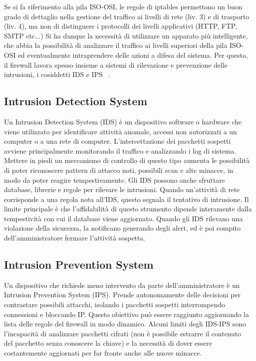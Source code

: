 Se si fa riferimento alla pila ISO-OSI, le regole di iptables permettono un buon grado di dettaglio nella gestione del traffico ai livelli di rete (liv. 3) e di trasporto (liv. 4), ma non di distinguere i protocolli dei livelli applicativi (HTTP, FTP, SMTP etc...)
Si ha dunque la necessità di utilizzare un apparato più intelligente, che abbia la possibilità di analizzare il traffico ai livelli superiori della pila ISO-OSI ed eventualmente intraprendere delle azioni a difesa del sistema. Per questo, il firewall lavora spesso insieme a sistemi di rilevazione e prevenzione delle intrusioni, i cosiddetti IDS e IPS ~\cite{extraordy}.

\subsection{Intrusion Detection System}

Un Intrusion Detection System (IDS) è un dispositivo software o hardware che viene utilizzato per identificare attività anomale, accessi non autorizzati a un computer o a una rete di computer. L'intercettazione dei pacchetti sospetti avviene principalmente monitorando il traffico e analizzando i log di sistema. Mettere in piedi un meccanismo di controllo di questo tipo aumenta le possibilità di poter riconoscere pattern di attacco noti, possibili scan e alte minacce, in modo da poter reagire tempestivamente. Gli IDS possono anche sfruttare database, librerie e regole per rilevare le intrusioni. Quando un'attività di rete corrisponde a una regola nota all'IDS, questo segnala il tentativo di intrusione. Il limite principale è che l'affidabilità di questo strumento dipende interamente dalla tempestività con cui il database viene aggiornato.
Quando gli IDS rilevano una violazione della sicurezza, la notificano generando degli alert, ed è poi compito dell'amministratore fermare l'attività sospetta.

\subsection{Intrusion Prevention System}

Un dispositivo che richiede meno intervento da parte dell'amministratore è un Intrusion Prevention System (IPS). Prende autonomamente delle decisioni per contrastare possibili attacchi, isolando i pacchetti sospetti interrompendo connessioni e bloccando IP. Questo obiettivo può essere raggiunto aggiornando la lista delle regole del firewall in modo dinamico.
Alcuni limiti degli IDS-IPS sono l'incapacità di analizzare pacchetti cifrati (non è possibile estrarre il contenuto del pacchetto senza conoscere la chiave) e la necessità di dover essere costantemente aggiornati per far fronte anche alle nuove minacce.

